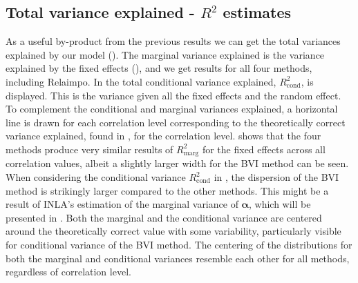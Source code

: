 \subsection{Total variance explained - $R^2$ estimates}
\label{sec:R2} 
As a useful by-product from the previous results we can get the total variances explained by our model ().
The marginal variance explained is the variance explained by the fixed effects (), and we get results for all four methods, including Relaimpo.
In  the total conditional variance explained, $R^2_{\text{cond}}$, is displayed. 
This is the variance given all the fixed effects and the random effect.
To complement the conditional and marginal variances explained, a horizontal line is drawn for each correlation level corresponding to the theoretically correct variance explained, found in , for the correlation level. 
\newline
\newline
{} shows that the four methods produce very similar results of $R^2_{\text{marg}}$ for the fixed effects across all correlation values, albeit a slightly larger width for the BVI method can be seen.
When considering the conditional variance $R^2_{\text{cond}}$ in , the dispersion of the BVI method is strikingly larger compared to the other methods. 
This might be a result of INLA's estimation of the marginal variance of $\boldsymbol{\alpha}$, which will be presented in .
Both the marginal and the conditional variance are centered around the theoretically correct value with some variability, particularly visible for conditional variance of the BVI method. 
The centering of the distributions for both the marginal and conditional variances resemble each other for all methods, regardless of correlation level.

